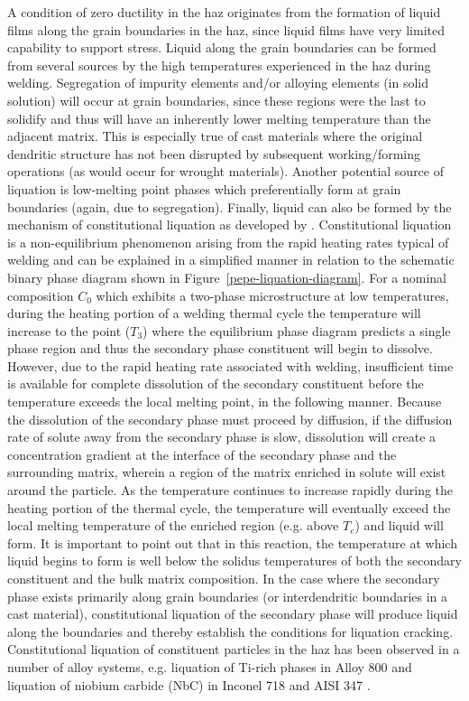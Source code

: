 A condition of zero ductility in the \gls{haz} originates from the formation of liquid films along the grain boundaries in the \gls{haz}, since liquid films have very limited capability to support stress. Liquid along the grain boundaries can be formed from several sources by the high temperatures experienced in the \gls{haz} during welding. Segregation of impurity elements and/or alloying elements (in solid solution) will occur at grain boundaries, since these regions were the last to solidify and thus will have an inherently lower melting temperature than the adjacent matrix. This is especially true of cast materials where the original dendritic structure has not been disrupted by subsequent working/forming operations (as would occur for wrought materials). Another potential source of liquation is low-melting point phases which preferentially form at grain boundaries (again, due to segregation). Finally, liquid can also be formed by the mechanism of constitutional liquation as developed by \citet{pepe_effects_1967}. Constitutional liquation is a non-equilibrium phenomenon arising from the rapid heating rates typical of welding and can be explained in a simplified manner in relation to the schematic binary phase diagram shown in Figure~\ref{pepe-liquation-diagram}. For a nominal composition $C_0$ which exhibits a two-phase microstructure at low temperatures, during the heating portion of a welding thermal cycle the temperature will increase to the point ($T_3$) where the equilibrium phase diagram predicts a single phase region and thus the secondary phase constituent will begin to dissolve. However, due to the rapid heating rate associated with welding, insufficient time is available for complete dissolution of the secondary constituent before the temperature exceeds the local melting point, in the following manner. Because the dissolution of the secondary phase must proceed by diffusion, if the diffusion rate of solute away from the secondary phase is slow, dissolution will create a concentration gradient at the interface of the secondary phase and the surrounding matrix, wherein a region of the matrix enriched in solute will exist around the particle. As the temperature continues to increase rapidly during the heating portion of the thermal cycle, the temperature will eventually exceed the local melting temperature of the enriched region (e.g. above $T_e$) and liquid will form. It is important to point out that in this reaction, the temperature at which liquid begins to form is well below the solidus temperatures of both the secondary constituent and the bulk matrix composition. In the case where the secondary phase exists primarily along grain boundaries (or interdendritic boundaries in a cast material), constitutional liquation of the secondary phase will produce liquid along the boundaries and thereby establish the conditions for liquation cracking. Constitutional liquation of constituent particles in the \gls{haz} has been observed in a number of alloy systems, e.g. liquation of Ti-rich phases in Alloy 800 \cite{lippold_investigation_1983} and liquation of niobium carbide (NbC) in Inconel 718 \cite{radhakrishnan_phase_1991} and AISI 347 \cite{lee_weldability_1988}.

